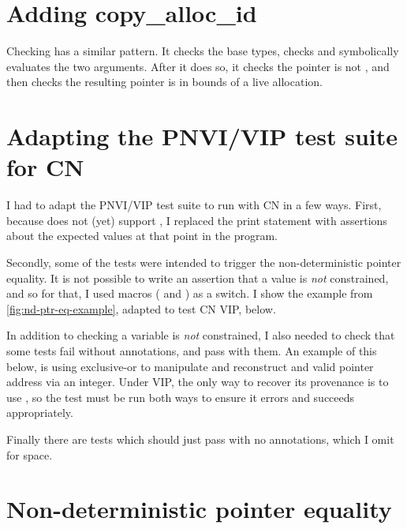
\section{Adding copy\_alloc\_id}

Checking  has a similar pattern. It checks the base
types, checks and symbolically evaluates the two arguments. After it does so,
it checks the pointer is not , and then checks the resulting
pointer is in bounds of a live allocation.


\section{Adapting the PNVI/VIP test suite for CN}

I had to adapt the PNVI/VIP test suite to run with CN in a few ways. First,
because  does not (yet) support , I replaced the print
statement with assertions about the expected values at that point in the
program.

Secondly, some of the tests were intended to trigger the non-deterministic
pointer equality. It is not possible to write an assertion that a value
is \emph{not} constrained, and so for that, I used macros
( and ) as a switch. I show the
example from \cref{fig:nd-ptr-eq-example}, adapted to test CN VIP, below.


In addition to checking a variable is \emph{not} constrained, I also needed to
check that some tests fail without  annotations, and
pass with them. An example of this below, is using exclusive-or to manipulate
and reconstruct and valid pointer address via an integer. Under VIP, the only
way to recover its provenance is to use , so the test
must be run both ways to ensure it errors and succeeds appropriately.


Finally there are tests which should just pass with no annotations, which I
omit for space.

\section{Non-deterministic pointer equality}

